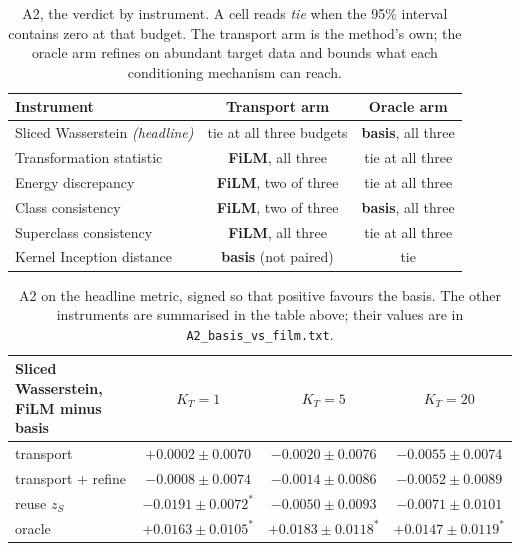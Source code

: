 \documentclass{article}
\begin{document}
\begin{table}[h]
\centering
\small
\begin{tabular}{lcc}
\toprule
Instrument & Transport arm & Oracle arm\\
\midrule
Sliced Wasserstein \emph{(headline)} & tie at all three budgets & \textbf{basis}, all three\\
Transformation statistic & \textbf{FiLM}, all three & tie at all three\\
Energy discrepancy & \textbf{FiLM}, two of three & tie at all three\\
Class consistency & \textbf{FiLM}, two of three & \textbf{basis}, all three\\
Superclass consistency & \textbf{FiLM}, all three & tie at all three\\
Kernel Inception distance & \textbf{basis} (not paired) & tie\\
\bottomrule
\end{tabular}
\caption{A2, the verdict by instrument. A cell reads \emph{tie} when the 95\% interval
contains zero at that budget. The transport arm is the method's own; the oracle arm refines
on abundant target data and bounds what each conditioning mechanism can reach.}
\end{table}

\begin{table}[h]
\centering
\small
\begin{tabular}{lccc}
\toprule
Sliced Wasserstein, FiLM minus basis & $K_T=1$ & $K_T=5$ & $K_T=20$\\
\midrule
transport & $+0.0002 \pm 0.0070$ & $-0.0020 \pm 0.0076$ & $-0.0055 \pm 0.0074$\\
transport $+$ refine & $-0.0008 \pm 0.0074$ & $-0.0014 \pm 0.0086$ & $-0.0052 \pm 0.0089$\\
reuse $z_S$ & $-0.0191 \pm 0.0072^{*}$ & $-0.0050 \pm 0.0093$ & $-0.0071 \pm 0.0101$\\
oracle & $+0.0163 \pm 0.0105^{*}$ & $+0.0183 \pm 0.0118^{*}$ & $+0.0147 \pm 0.0119^{*}$\\
\bottomrule
\end{tabular}
\caption{A2 on the headline metric, signed so that positive favours the basis. The other
instruments are summarised in the table above; their values are in
\texttt{A2\_basis\_vs\_film.txt}.}
\end{table}
\end{document}
